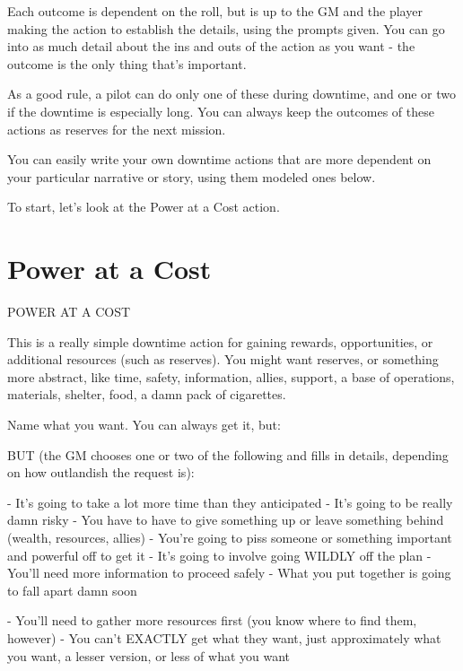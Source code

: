 Each outcome is dependent on the roll, but is up to the GM and the player making the action to  
establish the details, using the prompts given. You can go into as much detail about the ins and  
outs of the action as you want - the outcome is the only thing that’s important.  

As a good rule, a pilot can do only one of these during downtime, and one or two if the downtime  
is especially long. You can always keep the outcomes of these actions as reserves for the next  
mission.  

You can easily write your own downtime actions that are more dependent on your particular  
narrative or story, using them modeled ones below.  

To start, let’s look at the Power at a Cost action.  

\section{Power at a Cost}
POWER AT A COST  

This is a really simple downtime action for gaining rewards, opportunities, or additional  
resources (such as reserves). You might want reserves, or something more abstract, like time,  
safety, information, allies, support, a base of operations, materials, shelter, food, a damn  
pack of cigarettes.
 

Name what you want. You can always get it, but:  

BUT (the GM chooses one or two of the following and fills in details, depending on how  
outlandish the request is):
 
    -    It’s going to take a lot more time than they anticipated  
    -    It’s going to be really damn risky  
    -    You have to have to give something up or leave something behind (wealth, resources,  
         allies)  
    -    You’re going to piss someone or something important and powerful off to get it  
    -    It’s going to involve going WILDLY off the plan  
    -    You’ll need more information to proceed safely  
    -    What you put together is going to fall apart damn soon  

                                                                                                                  


    -    You’ll need to gather more resources first (you know where to find them, however)  
    -    You can’t EXACTLY get what they want, just approximately what you want, a lesser  
         version, or less of what you want
 

